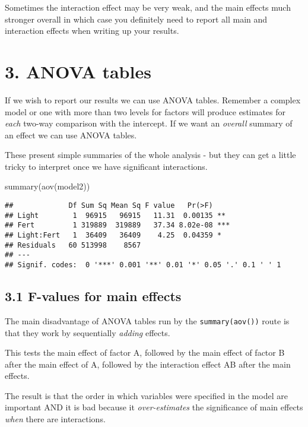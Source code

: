 \documentclass[
]{article}
\newenvironment{Shaded}{\begin{snugshade}}{\end{snugshade}}
\newcommand{\FunctionTok}[1]{\textcolor[rgb]{0.00,0.00,0.00}{#1}}
\newcommand{\NormalTok}[1]{#1}
\begin{document}
Sometimes the interaction effect may be very weak, and the main effects
much stronger overall in which case you definitely need to report all
main and interaction effects when writing up your results.

\hypertarget{anova-tables}{%
\section{3. ANOVA tables}\label{anova-tables}}

If we wish to report our results we can use ANOVA tables. Remember a
complex model or one with more than two levels for factors will produce
estimates for \emph{each} two-way comparison with the intercept. If we
want an \emph{overall} summary of an effect we can use ANOVA tables.

These present simple summaries of the whole analysis - but they can get
a little tricky to interpret once we have significant interactions.

\begin{Shaded}
\begin{Highlighting}[]
\FunctionTok{summary}\NormalTok{(}\FunctionTok{aov}\NormalTok{(model2))}
\end{Highlighting}
\end{Shaded}

\begin{verbatim}
##             Df Sum Sq Mean Sq F value   Pr(>F)    
## Light        1  96915   96915   11.31  0.00135 ** 
## Fert         1 319889  319889   37.34 8.02e-08 ***
## Light:Fert   1  36409   36409    4.25  0.04359 *  
## Residuals   60 513998    8567                     
## ---
## Signif. codes:  0 '***' 0.001 '**' 0.01 '*' 0.05 '.' 0.1 ' ' 1
\end{verbatim}

\hypertarget{f-values-for-main-effects}{%
\subsection{3.1 F-values for main
effects}\label{f-values-for-main-effects}}

The main disadvantage of ANOVA tables run by the \texttt{summary(aov())}
route is that they work by sequentially \emph{adding} effects.

This tests the main effect of factor A, followed by the main effect of
factor B after the main effect of A, followed by the interaction effect
AB after the main effects.

The result is that the order in which variables were specified in the
model are important AND it is bad because it \emph{over-estimates} the
significance of main effects \emph{when} there are interactions.
\end{document}
